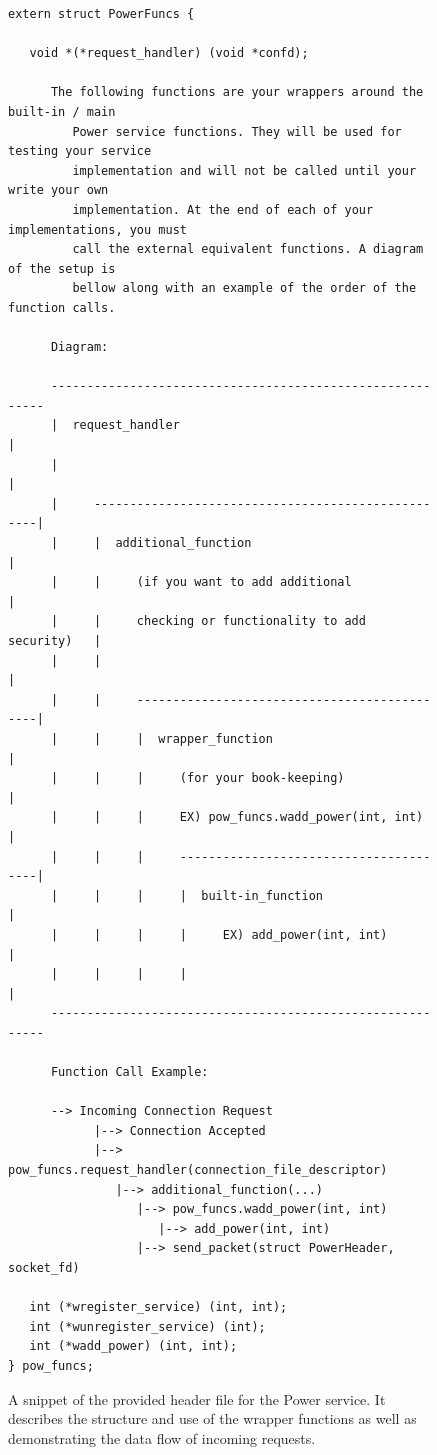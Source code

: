 \documentclass[10pt]{article}
\begin{document}
\begin{figure}[here]
\small
\begin{verbatim}
extern struct PowerFuncs {     

   void *(*request_handler) (void *confd);

      The following functions are your wrappers around the built-in / main 
      	 Power service functions. They will be used for testing your service 
         implementation and will not be called until your write your own
         implementation. At the end of each of your implementations, you must
         call the external equivalent functions. A diagram of the setup is
         bellow along with an example of the order of the function calls.

      Diagram:

      ----------------------------------------------------------
      |  request_handler                                       |
      |                                                        |
      |     ---------------------------------------------------|
      |     |  additional_function                             |
      |     |     (if you want to add additional               |
      |     |     checking or functionality to add security)   |
      |     |                                                  |
      |     |     ---------------------------------------------|
      |     |     |  wrapper_function                          |
      |     |     |     (for your book-keeping)                |
      |     |     |     EX) pow_funcs.wadd_power(int, int)     |
      |     |     |     ---------------------------------------|
      |     |     |     |  built-in_function                   |
      |     |     |     |     EX) add_power(int, int)          |
      |     |     |     |                                      |
      ----------------------------------------------------------

      Function Call Example:
         
      --> Incoming Connection Request
            |--> Connection Accepted
            |--> pow_funcs.request_handler(connection_file_descriptor)
               |--> additional_function(...)
                  |--> pow_funcs.wadd_power(int, int)
                     |--> add_power(int, int)
                  |--> send_packet(struct PowerHeader, socket_fd)

   int (*wregister_service) (int, int);
   int (*wunregister_service) (int);
   int (*wadd_power) (int, int);
} pow_funcs;
\end{verbatim}
\caption{A snippet of the provided header file for the Power service. It
describes the structure and use of the wrapper functions as well as
demonstrating the data flow of incoming requests.}
\label{fig:wraperStructEx}
\end{figure}
\end{document}
